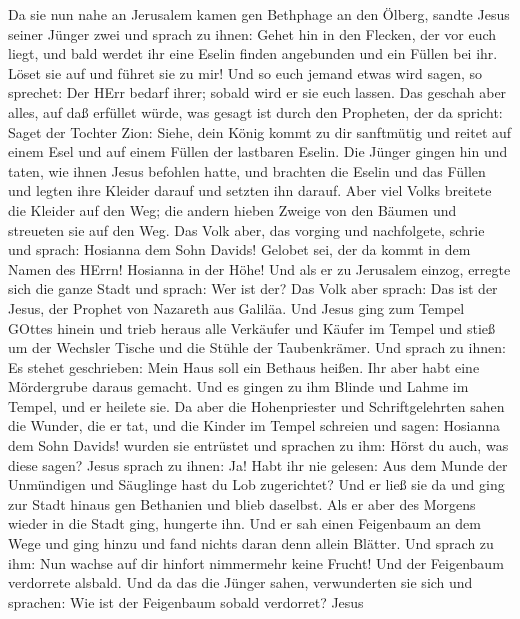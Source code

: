  Da sie nun nahe an Jerusalem kamen gen Bethphage an den
Ölberg, sandte Jesus seiner Jünger zwei  und sprach zu
ihnen: Gehet hin in den Flecken, der vor euch liegt, und bald werdet ihr
eine Eselin finden angebunden und ein Füllen bei ihr. Löset sie auf und
führet sie zu mir!  Und so euch jemand etwas wird sagen, so
sprechet: Der HErr bedarf ihrer; sobald wird er sie euch lassen.
 Das geschah aber alles, auf daß erfüllet würde, was gesagt
ist durch den Propheten, der da spricht:  Saget der Tochter
Zion: Siehe, dein König kommt zu dir sanftmütig und reitet auf einem
Esel und auf einem Füllen der lastbaren Eselin.  Die Jünger
gingen hin und taten, wie ihnen Jesus befohlen hatte,  und
brachten die Eselin und das Füllen und legten ihre Kleider darauf und
setzten ihn darauf.  Aber viel Volks breitete die Kleider
auf den Weg; die andern hieben Zweige von den Bäumen und streueten sie
auf den Weg.  Das Volk aber, das vorging und nachfolgete,
schrie und sprach: Hosianna dem Sohn Davids! Gelobet sei, der da kommt
in dem Namen des HErrn! Hosianna in der Höhe!  Und als er
zu Jerusalem einzog, erregte sich die ganze Stadt und sprach: Wer ist
der?  Das Volk aber sprach: Das ist der Jesus, der Prophet
von Nazareth aus Galiläa.  Und Jesus ging zum Tempel GOttes
hinein und trieb heraus alle Verkäufer und Käufer im Tempel und stieß um
der Wechsler Tische und die Stühle der Taubenkrämer.  Und
sprach zu ihnen: Es stehet geschrieben: Mein Haus soll ein Bethaus
heißen. Ihr aber habt eine Mördergrube daraus gemacht.  Und
es gingen zu ihm Blinde und Lahme im Tempel, und er heilete sie.
 Da aber die Hohenpriester und Schriftgelehrten sahen die
Wunder, die er tat, und die Kinder im Tempel schreien und sagen:
Hosianna dem Sohn Davids! wurden sie entrüstet  und
sprachen zu ihm: Hörst du auch, was diese sagen? Jesus sprach zu ihnen:
Ja! Habt ihr nie gelesen: Aus dem Munde der Unmündigen und Säuglinge
hast du Lob zugerichtet?  Und er ließ sie da und ging zur
Stadt hinaus gen Bethanien und blieb daselbst.  Als er aber
des Morgens wieder in die Stadt ging, hungerte ihn.  Und er
sah einen Feigenbaum an dem Wege und ging hinzu und fand nichts daran
denn allein Blätter. Und sprach zu ihm: Nun wachse auf dir hinfort
nimmermehr keine Frucht! Und der Feigenbaum verdorrete alsbald.
 Und da das die Jünger sahen, verwunderten sie sich und
sprachen: Wie ist der Feigenbaum sobald verdorret?  Jesus
